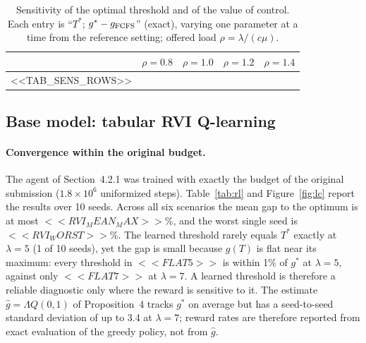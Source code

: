 \begin{table}[t]
\centering\small
\caption{Sensitivity of the optimal threshold and of the value of control. Each entry is ``$T^*$; $g^*-g_{\rm FCFS}$'' (exact), varying one parameter at a time from the reference setting; offered load $\rho=\lambda/(c\mu)$.}\label{tab:sens}
\begin{tabular}{@{}lcccc@{}}
\toprule
 & $\rho=0.8$ & $\rho=1.0$ & $\rho=1.2$ & $\rho=1.4$\\
\midrule
<<TAB_SENS_ROWS>>
\bottomrule
\end{tabular}
\end{table}

\subsection{Base model: tabular RVI Q-learning}\label{sec:num-tabular}

\paragraph{Convergence within the original budget.} The agent of Section~4.2.1 was trained with exactly the budget of the original submission ($1.8\times10^6$ uniformized steps). Table~\ref{tab:rl} and Figure~\ref{fig:lc} report the results over 10 seeds. Across all six scenarios the mean gap to the optimum is at most $<<RVI_MEAN_MAX>>$\%, and the worst single seed is $<<RVI_WORST>>$\%. The learned threshold rarely equals $T^*$ exactly at $\lambda=5$ (1 of 10 seeds), yet the gap is small because $g(T)$ is flat near its maximum: every threshold in $<<FLAT5>>$ is within 1\% of $g^*$ at $\lambda=5$, against only $<<FLAT7>>$ at $\lambda=7$. A learned threshold is therefore a reliable diagnostic only where the reward is sensitive to it. The estimate $\hat g=\Lambda Q(0,1)$ of Proposition~4 tracks $g^*$ on average but has a seed-to-seed standard deviation of up to 3.4 at $\lambda=7$; reward rates are therefore reported from exact evaluation of the greedy policy, not from $\hat g$.

\begin{table}[t]
\centering\small
\caption{Tabular learners on the base model, 10 seeds, $1.8\times10^6$ steps, greedy policies evaluated exactly. $T$: occupancy at which the greedy policy first rejects (median [min, max]); ``exact'': seeds with $T=T^*$; gaps $(g^*-g)/g^*$ in \%; $\hat g=\Lambda Q(0,1)$, mean (s.d.).}\label{tab:rl}
\end{table}

